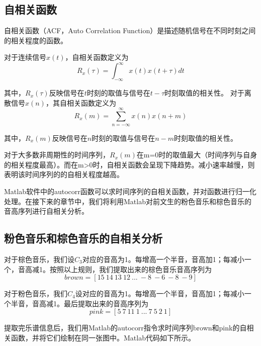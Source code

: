 \documentclass[a4paper,12pt]{article} %
\begin{document}
\subsection{自相关函数}
    自相关函数（ACF，Auto Correlation Function）是描述随机信号在不同时刻之间的相关程度的函数。\par
    对于连续信号$x(t)$，自相关函数定义为$$R_x(\tau)=\int_{-\infty}^{\infty}x(t)x(t+\tau)dt$$\par
    其中，$R_x(\tau)$反映信号在$t$时刻的取值与信号在$t-\tau$时刻取值的相关性。
    对于离散信号$x(n)$，其自相关函数定义为$$R_x(m)=\sum_{n=-\infty}^{\infty}x(n)x(n+m)$$\par
    其中，$R_x(m)$反映信号在$n$时刻的取值与信号在$n-m$时刻取值的相关性。\par
    对于大多数非周期性的时间序列，$R_x(m)$在m=0时的取值最大（时间序列与自身的相关程度最高）。而在m>0时，自相关函数会呈现下降趋势。减小速率越慢，则表明该时间序列的的自相关程度越高。\par
    Matlab软件中的autocorr函数可以求时间序列的自相关函数，并对函数进行归一化处理。在接下来的章节中，我们将利用Matlab对前文生的粉色音乐和棕色音乐的音高序列进行自相关分析。\par
\subsection{粉色音乐和棕色音乐的自相关分析}
    对于棕色音乐，我们设$C_3$对应的音高为1。每增高一个半音，音高加1；每减小一个，音高减1。按照以上规则，我们提取出来的棕色音乐音高序列为$$brown=[15\ 14\ 13\ 12\ ...\ -8\ -6\ -8\ -9]$$\par
    对于粉色音乐，我们$C_4$设对应的音高为1。每增高一个半音，音高加1；每减小一个半音，音高减1。最后提取出来的音高序列为$$pink=[5\ 7\ 11\ 1\ ...\ 7\ 5\ 2\ 1]$$\par
    提取完乐谱信息后，我们用Matlab的autocorr指令求时间序列brown和pink的自相关函数，并将它们绘制在同一张图中。Matlab代码如下所示。\par
\end{document}
